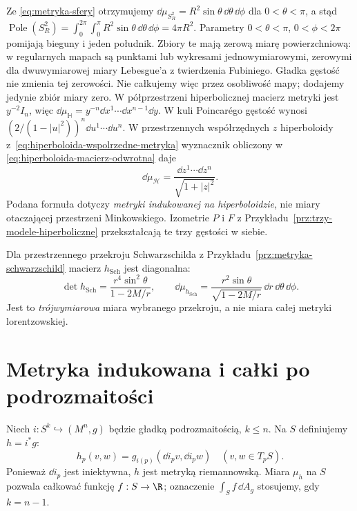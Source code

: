 \begin{przyklad}
Ze \eqref{eq:metryka-sfery} otrzymujemy
$\dd\mu_{S_R^2}=R^2\sin\theta\,
\dd\theta\,\dd\phi$ dla $0<\theta<\pi$,
a stąd
$\operatorname{Pole}(S_R^2)
=\int_0^{2\pi}\int_0^\pi
R^2\sin\theta\,\dd\theta\,\dd\phi=4\pi R^2$.
Parametry $0<\theta<\pi$, $0<\phi<2\pi$ pomijają
bieguny i jeden południk. Zbiory te mają zerową miarę
powierzchniową: w regularnych mapach są punktami lub
wykresami jednowymiarowymi, zerowymi dla dwuwymiarowej
miary Lebesgue'a z twierdzenia Fubiniego. Gładka gęstość
nie zmienia tej zerowości. Nie całkujemy więc przez
osobliwość mapy; dodajemy jedynie zbiór miary zero.
W półprzestrzeni hiperbolicznej macierz
metryki jest $y^{-2}I_n$, więc
$\dd\mu_{\mathbb H}=y^{-n}\dd x^1\cdots
\dd x^{n-1}\dd y$.
W kuli Poincarégo gęstość wynosi
$(2/(1-|u|^2))^n\dd u^1\cdots\dd u^n$.
W przestrzennych współrzędnych $z$ hiperboloidy
z~\eqref{eq:hiperboloida-wspolrzedne-metryka}
wyznacznik obliczony w
\eqref{eq:hiperboloida-macierz-odwrotna} daje
\[
 \dd\mu_{\mathcal H}
  =\frac{\dd z^1\cdots\dd z^n}{\sqrt{1+|z|^2}}.
\]
Podana formuła dotyczy \emph{metryki indukowanej
na hiperboloidzie}, nie miary otaczającej
przestrzeni Minkowskiego. Izometrie $P$ i $F$
z Przykładu~\ref{prz:trzy-modele-hiperboliczne}
przekształcają te trzy gęstości w siebie.

Dla przestrzennego przekroju Schwarzschilda
z Przykładu~\ref{prz:metryka-schwarzschild}
macierz $h_{\mathrm{Sch}}$ jest diagonalna:
\[
 \det h_{\mathrm{Sch}}
  =\frac{r^4\sin^2\theta}{1-2M/r},
 \qquad
 \dd\mu_{h_{\mathrm{Sch}}}
  =\frac{r^2\sin\theta}{\sqrt{1-2M/r}}\,
       \dd r\,\dd\theta\,\dd\phi.
\]
Jest to \emph{trójwymiarowa} miara wybranego
przekroju, a nie miara całej metryki lorentzowskiej.
\end{przyklad}

\section{Metryka indukowana i całki po podrozmaitości}
\label{sec:metryka-indukowana}

\begin{definicja}
\label{def:metryka-indukowana}
Niech $i:S^k\hookrightarrow(M^n,g)$ będzie
gładką podrozmaitością, $k\leq n$.
Na $S$ definiujemy $h=i^*g$:
\[
 h_p(v,w)=g_{i(p)}(\dd i_pv,\dd i_pw)
 \quad(v,w\in T_pS).
\]
Ponieważ $\dd i_p$ jest iniektywna, $h$ jest
metryką riemannowską. Miara $\mu_h$ na $S$
pozwala całkować funkcję $f:S\to\R$;
oznaczenie $\int_S f\,\dd A_g$ stosujemy,
gdy $k=n-1$.
\end{definicja}

